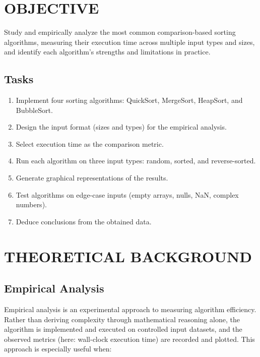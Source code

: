 \documentclass[12pt]{article}
\begin{document}
\section*{OBJECTIVE}

Study and empirically analyze the most common comparison-based sorting algorithms, measuring
their execution time across multiple input types and sizes, and identify each algorithm's
strengths and limitations in practice.

\subsection*{Tasks}

\begin{enumerate}
  \item Implement four sorting algorithms: QuickSort, MergeSort, HeapSort, and BubbleSort.
  \item Design the input format (sizes and types) for the empirical analysis.
  \item Select execution time as the comparison metric.
  \item Run each algorithm on three input types: random, sorted, and reverse-sorted.
  \item Generate graphical representations of the results.
  \item Test algorithms on edge-case inputs (empty arrays, nulls, NaN, complex numbers).
  \item Deduce conclusions from the obtained data.
\end{enumerate}

\section*{THEORETICAL BACKGROUND}

\subsection*{Empirical Analysis}

\hspace{0.8cm} Empirical analysis is an experimental approach to measuring algorithm efficiency.
Rather than deriving complexity through mathematical reasoning alone, the algorithm is implemented
and executed on controlled input datasets, and the observed metrics (here: wall-clock execution time)
are recorded and plotted. This approach is especially useful when:
\end{document}
